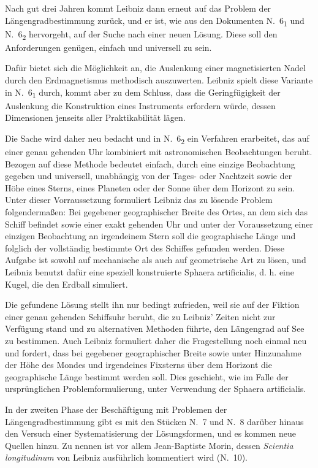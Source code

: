 Nach gut drei Jahren kommt Leibniz dann erneut auf das Problem der L\"{a}ngengradbestimmung zur\"{u}ck, und er ist, wie aus den Dokumenten N.~6\textsubscript{1} und N.~6\textsubscript{2} hervorgeht, auf der Suche nach einer neuen L\"{o}sung. Diese soll den Anforderungen gen\"{u}gen, einfach und universell zu sein.\par
Daf\"{u}r bietet sich die M\"{o}glichkeit an, die Auslenkung einer magnetisierten Nadel durch den Erdmagnetismus methodisch auszuwerten. Leibniz spielt diese Variante in N.~6\textsubscript{1} durch, kommt aber zu dem Schluss, dass die Geringf\"{u}gigkeit der Auslenkung die Konstruktion eines Instruments erfordern w\"{u}rde, dessen Dimensionen jenseits aller Praktikabilit\"{a}t l\"{a}gen.\par
Die Sache wird daher neu bedacht und in N.~6\textsubscript{2} ein Verfahren erarbeitet, das auf einer genau gehenden Uhr kombiniert mit astronomischen Beobachtungen beruht. Bezogen auf diese Methode bedeutet einfach, durch eine einzige Beob\-achtung gegeben und universell, unabh\"{a}ngig von der Tages- oder Nachtzeit sowie der H\"{o}he eines Sterns, eines Planeten oder der Sonne \"{u}ber dem Horizont zu sein. Unter dieser Vorraussetzung formuliert Leibniz das zu l\"{o}sende Problem folgenderma{\ss}en: Bei gegebener geographischer Breite des Ortes, an dem sich das Schiff befindet sowie einer exakt gehenden Uhr und unter der Voraussetzung einer einzigen Beobachtung an irgendeinem Stern soll die geographische L\"{a}nge und folg\-lich der vollst\"{a}ndig bestimmte Ort des Schiffes gefunden werden. Diese Aufgabe ist sowohl auf mechanische als auch auf geometrische Art zu l\"{o}sen, und Leibniz benutzt daf\"{u}r eine speziell konstruierte Sphaera artificialis, d. h. eine Kugel, die den Erdball simuliert.\par
Die gefundene L\"{o}sung stellt ihn nur bedingt zufrieden, weil sie auf der Fik\-tion einer genau gehenden Schiffsuhr beruht, die zu Leibniz' Zeiten nicht zur Verf\"{u}gung stand und zu alternativen Methoden f\"{u}hrte, den L\"{a}ngengrad auf See zu bestimmen. Auch Leibniz formuliert daher die Fragestellung noch einmal neu und fordert, dass bei gegebener geographischer Breite sowie unter Hinzunahme der H\"{o}he des Mondes und irgendeines Fixsterns \"{u}ber dem Horizont die geographische L\"{a}nge bestimmt werden soll. Dies geschieht, wie im Falle der urspr\"{u}nglichen Problemformulierung, unter Verwendung der Sphaera artificialis.\par
In der zweiten Phase der Besch\"{a}ftigung mit Problemen der L\"{a}ngengradbestimmung gibt es mit den St\"{u}cken N.~7 und N.~8 dar\"{u}ber hinaus den Versuch einer Systematisierung der L\"{o}sungsformen, und es kommen neue Quellen hinzu. Zu nennen ist vor allem Jean-Baptiste Morin, dessen \textit{Scientia longitudinum} von Leibniz ausf\"{u}hrlich kommentiert wird (N.~10).\par
